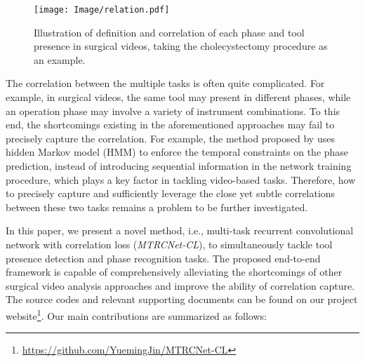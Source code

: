 \documentclass{elsarticle}
\begin{document}
\begin{figure*}[t]
	\centering
	\texttt{[image: Image/relation.pdf]}
	\vspace{-1mm}
	\caption{Illustration of definition and correlation of each phase and tool presence in surgical videos, taking the cholecystectomy procedure as an example.}
	\label{fig:relation}
\end{figure*}


The correlation between the multiple tasks is often quite complicated. For example, in surgical videos, the same tool may present in different phases, while an operation phase may involve a variety of instrument combinations. 
To this end, the shortcomings existing in the aforementioned approaches may fail to precisely capture the correlation.
For example, the method proposed by \cite{twinanda2017endonet} uses hidden Markov model (HMM) to enforce the temporal constraints on the phase prediction, instead of introducing sequential information in the network training procedure, which plays a key factor in tackling video-based tasks.
Therefore, how to precisely capture and sufficiently leverage the close yet subtle correlations between these two tasks remains a problem to be further investigated.


In this paper, we present a novel method, i.e., multi-task recurrent convolutional network with correlation loss (\emph{MTRCNet-CL}), to simultaneously tackle tool presence detection and phase recognition tasks.
The proposed end-to-end framework is capable of comprehensively alleviating the shortcomings of other surgical video analysis approaches and  improve the ability of correlation capture. 
The source codes and relevant supporting documents can be found on our project website\footnote{\url{https://github.com/YuemingJin/MTRCNet-CL}}.
Our main contributions are summarized as follows:
\end{document}
